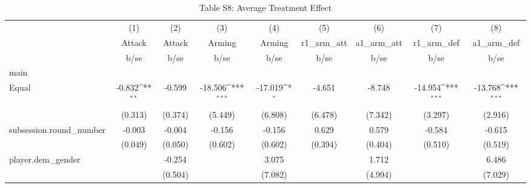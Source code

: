 \begin{table}[htbp]\centering
\def\sym#1{\ifmmode^{#1}\else\(^{#1}\)\fi}
\caption{Table S8: Average Treatment Effect}
\begin{tabular}{l*{8}{c}}
\hline\hline
                    &\multicolumn{1}{c}{(1)}&\multicolumn{1}{c}{(2)}&\multicolumn{1}{c}{(3)}&\multicolumn{1}{c}{(4)}&\multicolumn{1}{c}{(5)}&\multicolumn{1}{c}{(6)}&\multicolumn{1}{c}{(7)}&\multicolumn{1}{c}{(8)}\\
                    &\multicolumn{1}{c}{Attack}&\multicolumn{1}{c}{Attack}&\multicolumn{1}{c}{Arming}&\multicolumn{1}{c}{Arming}&\multicolumn{1}{c}{r1\_arm\_att}&\multicolumn{1}{c}{a1\_arm\_att}&\multicolumn{1}{c}{r1\_arm\_def}&\multicolumn{1}{c}{a1\_arm\_def}\\
                    &        b/se         &        b/se         &        b/se         &        b/se         &        b/se         &        b/se         &        b/se         &        b/se         \\
\hline
main                &                     &                     &                     &                     &                     &                     &                     &                     \\
Equal               &      -0.832\sym{**} &      -0.599         &     -18.506\sym{***}&     -17.019\sym{*}  &      -4.651         &      -8.748         &     -14.954\sym{***}&     -13.768\sym{***}\\
                    &     (0.313)         &     (0.374)         &     (5.449)         &     (6.808)         &     (6.478)         &     (7.342)         &     (3.297)         &     (2.916)         \\
subsession.round\_number&      -0.003         &      -0.004         &      -0.156         &      -0.156         &       0.629         &       0.579         &      -0.584         &      -0.615         \\
                    &     (0.049)         &     (0.050)         &     (0.602)         &     (0.602)         &     (0.394)         &     (0.404)         &     (0.510)         &     (0.519)         \\
player.dem\_gender   &                     &      -0.254         &                     &       3.075         &                     &       1.712         &                     &       6.486         \\
                    &                     &     (0.504)         &                     &     (7.082)         &                     &     (4.994)         &                     &     (7.029)         \\

\end{tabular}
\end{table}
